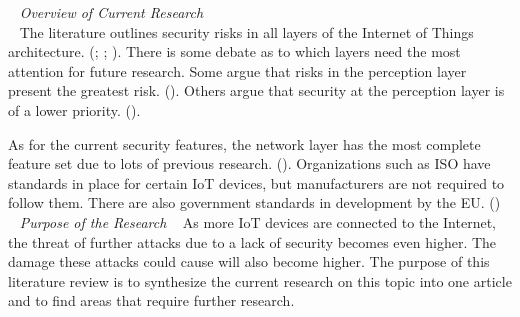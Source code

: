 \documentclass[letterpaper, 12pt]{texMemo}
\begin{document}
\begin{flushleft}
~\newline
\textit{Overview of Current Research}\\
~\newline
The literature outlines security risks in all layers of the Internet of Things architecture. (\cite{Xiaohui6643029}; \cite{Zhao6746513}; \cite{Suo6188257}). 
There is some debate as to which layers need the most attention for future research. Some argue that risks in the perception layer present the greatest risk. (\cite{Zhao6746513}).
Others argue that security at the perception layer is of a lower priority. (\cite{Kozlov}). 

As for the current security features, the network layer has the most
complete feature set due to lots of previous research. (\cite{Suo6188257}). Organizations such as ISO have standards in place for certain IoT devices, but manufacturers
are not required to follow them. There are also government standards in development by the EU. (\cite{Roman6017172}) \\
~\newline
\textit{Purpose of the Research}
~\newline
As more IoT devices are connected to the Internet, the threat of further attacks due to a lack of security becomes even higher. The damage these attacks could
cause will also become higher. The purpose of this literature review is to synthesize the current research on this topic into one article and to find areas that require 
further research.\\
~\newline


\end{flushleft}
\end{document}

